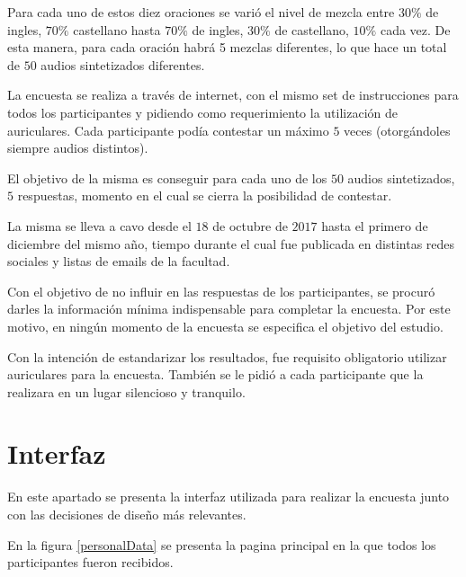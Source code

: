 Para cada uno de estos diez oraciones se varió el nivel de mezcla entre $30\%$ de ingles, $70\%$ castellano hasta $70\%$ de ingles, $30\%$ de castellano, $10\%$ cada vez. De esta manera, para cada oración habrá 5 mezclas diferentes, lo que hace un total de $50$ audios sintetizados diferentes.

La encuesta se realiza a través de internet, con el mismo set de instrucciones para todos los participantes y pidiendo como requerimiento la utilización de auriculares. Cada participante podía contestar un máximo $5$ veces (otorgándoles siempre audios distintos).

El objetivo de la misma es conseguir para cada uno de los $50$ audios sintetizados, $5$ respuestas, momento en el cual se cierra la posibilidad de contestar.

La misma se lleva a cavo desde el $18$ de octubre de $2017$ hasta el primero de diciembre del mismo año, tiempo durante el cual fue publicada en distintas redes sociales y listas de emails de la facultad.

Con el objetivo de no influir en las respuestas de los participantes, se procuró darles la información mínima indispensable para completar la encuesta. Por este motivo, en ningún momento de la encuesta se especifica el objetivo del estudio.

Con la intención de estandarizar los resultados, fue requisito obligatorio utilizar auriculares para la encuesta. También se le pidió a cada participante que la realizara en un lugar silencioso y tranquilo.

\section{Interfaz}

En este apartado se presenta la interfaz utilizada para realizar la encuesta junto con las decisiones de diseño más relevantes. 

En la figura \ref{personalData} se presenta la pagina principal en la que todos los participantes fueron recibidos.

